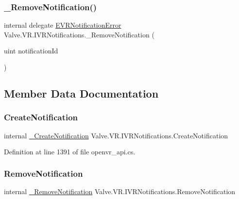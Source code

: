 \subsubsection{\texorpdfstring{\_RemoveNotification()}{\_RemoveNotification()}}
{\footnotesize\ttfamily internal delegate \mbox{\hyperlink{namespace_valve_1_1_v_r_a9cf788def226e718d9ea88fd55c55646}{E\+V\+R\+Notification\+Error}} Valve.\+V\+R.\+I\+V\+R\+Notifications.\+\_\+\+Remove\+Notification (\begin{DoxyParamCaption}\item[{uint}]{notification\+Id }\end{DoxyParamCaption})}



\subsection{Member Data Documentation}
\mbox{\label{struct_valve_1_1_v_r_1_1_i_v_r_notifications_a1d2d398c1586a0543ad970f777e0427a}} 
\subsubsection{\texorpdfstring{CreateNotification}{CreateNotification}}
{\footnotesize\ttfamily internal \mbox{\hyperlink{struct_valve_1_1_v_r_1_1_i_v_r_notifications_a2e0dd80f177dcb6d1abe8bd96f907867}{\+\_\+\+Create\+Notification}} Valve.\+V\+R.\+I\+V\+R\+Notifications.\+Create\+Notification}



Definition at line 1391 of file openvr\+\_\+api.\+cs.

\mbox{\label{struct_valve_1_1_v_r_1_1_i_v_r_notifications_abba0fee2e78b73b243af83745cbf0e9a}} 
\subsubsection{\texorpdfstring{RemoveNotification}{RemoveNotification}}
{\footnotesize\ttfamily internal \mbox{\hyperlink{struct_valve_1_1_v_r_1_1_i_v_r_notifications_a2778d2957ddd654d347f34e2659da671}{\+\_\+\+Remove\+Notification}} Valve.\+V\+R.\+I\+V\+R\+Notifications.\+Remove\+Notification}



